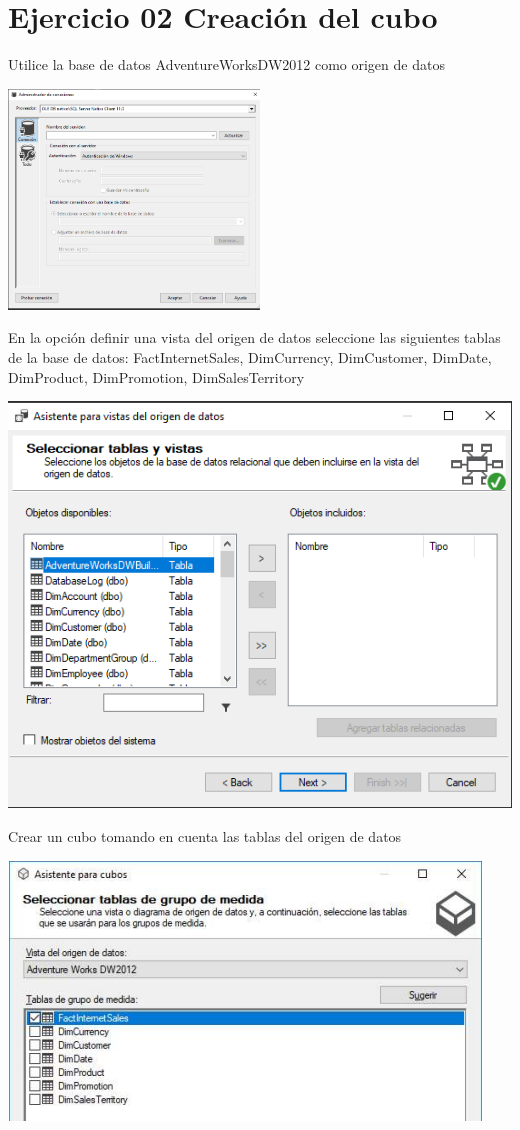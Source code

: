 \section{Ejercicio 02 Creación del cubo}

Utilice la base de datos AdventureWorksDW2012 como origen de datos
	\begin{center}
	\includegraphics[width=0.5\textwidth]{images/task2/44}
    \end{center}	
    
En la opción definir una vista del origen de datos seleccione las siguientes tablas de la base de datos:
FactInternetSales, DimCurrency, DimCustomer, DimDate, DimProduct, DimPromotion, DimSalesTerritory
	\begin{center}
	\includegraphics[width=0.5\columnwidth]{images/task2/99}
    \end{center}	
    
Crear un cubo tomando en cuenta las tablas del origen de datos
	\begin{center}
	\includegraphics[width=0.5\columnwidth]{images/task2/4}
	\end{center}	
	
